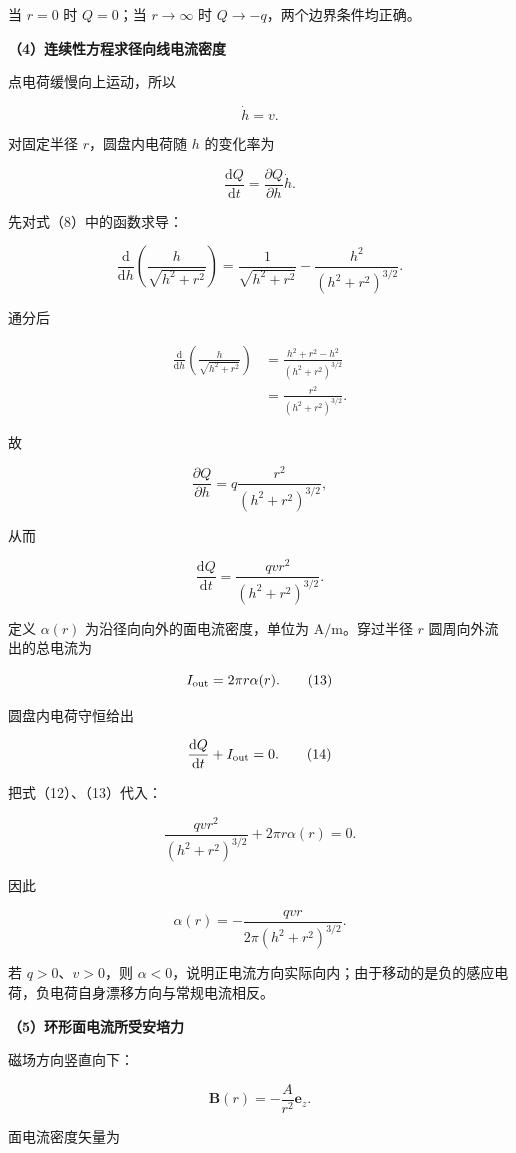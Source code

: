 \documentclass[12pt,a4paper,UTF8]{ctexart}
\begin{document}
当 \(r=0\) 时 \(Q=0\)；当 \(r\to\infty\) 时
\(Q\to-q\)，两个边界条件均正确。

\textbf{（4）连续性方程求径向线电流密度}

点电荷缓慢向上运动，所以

\[
\dot h=v.
\tag{9}
\]

对固定半径 \(r\)，圆盘内电荷随 \(h\) 的变化率为

\[
\frac{\mathrm dQ}{\mathrm dt}
=\frac{\partial Q}{\partial h}\dot h.
\tag{10}
\]

先对式（8）中的函数求导：

\[
\frac{\mathrm d}{\mathrm dh}
\left(\frac h{\sqrt{h^2+r^2}}\right)
=\frac1{\sqrt{h^2+r^2}}
-\frac{h^2}{(h^2+r^2)^{3/2}}.
\]

通分后

\[
\begin{aligned}
\frac{\mathrm d}{\mathrm dh}
\left(\frac h{\sqrt{h^2+r^2}}\right)
&=\frac{h^2+r^2-h^2}{(h^2+r^2)^{3/2}}\\
&=\frac{r^2}{(h^2+r^2)^{3/2}}.
\end{aligned}
\tag{11}
\]

故

\[
\frac{\partial Q}{\partial h}
=q\frac{r^2}{(h^2+r^2)^{3/2}},
\]

从而

\[
\frac{\mathrm dQ}{\mathrm dt}
=\frac{qvr^2}{(h^2+r^2)^{3/2}}.
\tag{12}
\]

定义 \(\alpha(r)\) 为沿径向向外的面电流密度，单位为
\(\mathrm{A/m}\)。穿过半径 \(r\) 圆周向外流出的总电流为

\[
I_{\rm out}=2\pi r\alpha(r).
\tag{13}
\]

圆盘内电荷守恒给出

\[
\frac{\mathrm dQ}{\mathrm dt}+I_{\rm out}=0.
\tag{14}
\]

把式（12）、（13）代入：

\[
\frac{qvr^2}{(h^2+r^2)^{3/2}}
+2\pi r\alpha(r)=0.
\]

因此

\[
\boxed{
\alpha(r)
=-\frac{qvr}{2\pi(h^2+r^2)^{3/2}}
}.
\tag{15}
\]

若 \(q>0\)、\(v>0\)，则
\(\alpha<0\)，说明正电流方向实际向内；由于移动的是负的感应电荷，负电荷自身漂移方向与常规电流相反。

\textbf{（5）环形面电流所受安培力}

磁场方向竖直向下：

\[
\bm B(r)=-\frac{A}{r^2}\bm e_z.
\tag{16}
\]

面电流密度矢量为
\end{document}
